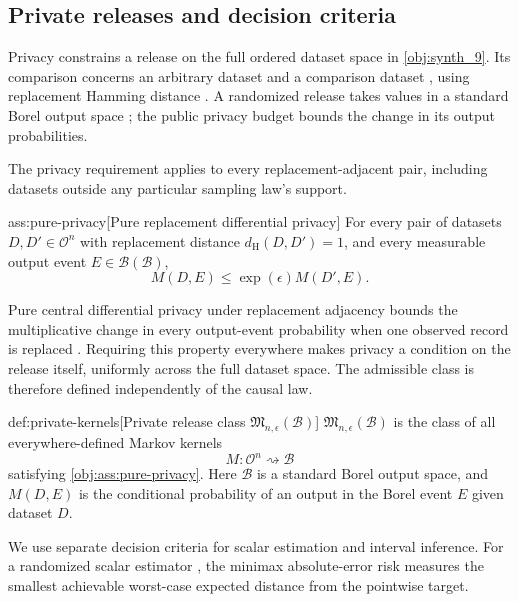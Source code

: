 \documentclass[11pt]{article}
\begin{document}
\subsection{Private releases and decision criteria}

Privacy constrains a release on the full ordered dataset space in \cref{obj:synth_9}. Its comparison concerns an arbitrary dataset and a comparison dataset , using replacement Hamming distance . A randomized release  takes values in a standard Borel output space ; the public privacy budget  bounds the change in its output probabilities.



The privacy requirement applies to every replacement-adjacent pair, including datasets outside any particular sampling law's support.

\begin{assumptionv}{ass:pure-privacy}[Pure replacement differential privacy]
For every pair of datasets \(D,D'\in\mathcal O^n\) with replacement distance \(d_{\mathrm H}(D,D')=1\), and every measurable output event \(E\in\mathcal B(\mathcal B)\),
\[
M(D,E)\le \exp(\epsilon)M(D',E).
\]
\end{assumptionv}

Pure central differential privacy under replacement adjacency bounds the multiplicative change in every output-event probability when one observed record is replaced \citep{AcharyaSunZhang2021}. Requiring this property everywhere makes privacy a condition on the release itself, uniformly across the full dataset space. The admissible class is therefore defined independently of the causal law.

\begin{definitionv}{def:private-kernels}[Private release class \(\mathfrak M_{n,\epsilon}(\mathcal B)\)]
\(\mathfrak M_{n,\epsilon}(\mathcal B)\) is the class of all everywhere-defined Markov kernels
\[
M:\mathcal O^n\rightsquigarrow\mathcal B
\]
satisfying \cref{obj:ass:pure-privacy}. Here \(\mathcal B\) is a standard Borel output space, and \(M(D,E)\) is the conditional probability of an output in the Borel event \(E\) given dataset \(D\).
\end{definitionv}

We use separate decision criteria for scalar estimation and interval inference. For a randomized scalar estimator , the minimax absolute-error risk  measures the smallest achievable worst-case expected distance from the pointwise target.
\end{document}

